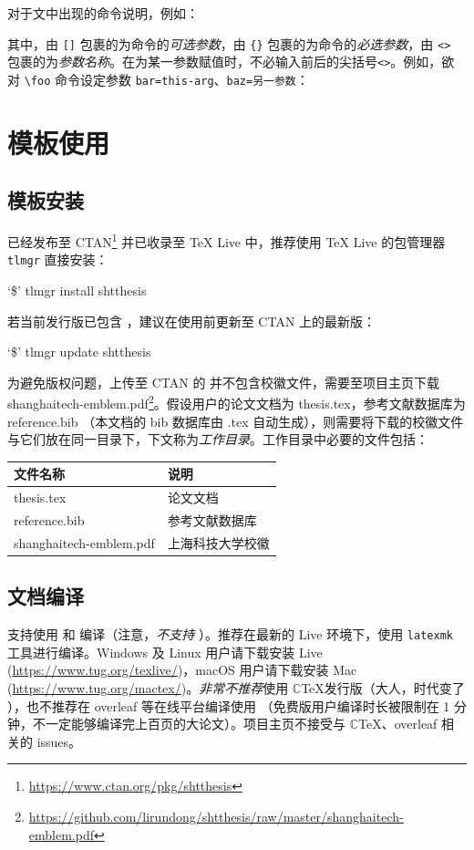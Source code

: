 \documentclass[master]{shtthesis}
\newcommand\prompt{\textup{\$}}
\providecommand{\emoji}[1]{ \fbox{\emph{#1}} }
\begin{document}
对于文中出现的命令说明，例如：
\begin{latex}
\end{latex}
其中，由 \verb|[]| 包裹的为命令的\emph{可选参数}，由 \verb|{}| 包裹的为命令的\emph{必选参数}，由 \verb|<>| 包裹的为\emph{参数名称}。在为某一参数赋值时，不必输入前后的尖括号\verb|<>|。例如，欲对 \verb|\foo| 命令设定参数 \verb|bar=this-arg|、\verb|baz=另一参数|：
\begin{latex}
\end{latex}

\chapter{模板使用}
\section{模板安装}
\shtthesis{} 已经发布至 CTAN\footnote{\url{https://www.ctan.org/pkg/shtthesis}} 并已收录至 \TeX{} Live 中，推荐使用 \TeX{} Live 的包管理器 \verb|tlmgr| 直接安装：
\begin{shell}
`\prompt' tlmgr install shtthesis
\end{shell}
若当前发行版已包含 \shtthesis{}，建议在使用前更新至 CTAN 上的最新版：
\begin{shell}
`\prompt' tlmgr update shtthesis
\end{shell}

为避免版权问题，上传至 CTAN 的 \shtthesis{} 并不包含校徽文件，需要至项目主页下载 shanghaitech-emblem.pdf\footnote{\url{https://github.com/lirundong/shtthesis/raw/master/shanghaitech-emblem.pdf}}。假设用户的论文文档为 thesis.tex，参考文献数据库为 reference.bib （本文档的 bib 数据库由 \jobname.tex 自动生成），则需要将下载的校徽文件与它们放在同一目录下，下文称为\emph{工作目录}。工作目录中必要的文件包括：
\begin{center}
  \begin{tabular}{ll}
    \toprule
    文件名称 & 说明 \\
    \midrule 
    thesis.tex & 论文文档 \\
    reference.bib & 参考文献数据库 \\
    shanghaitech-emblem.pdf & 上海科技大学校徽 \\
    \bottomrule
  \end{tabular}
\end{center}

\section{文档编译}
\shtthesis{} 支持使用  和  编译（注意，\emph{不支持} ）。推荐在最新的  Live 环境下，使用 \verb|latexmk| 工具进行编译。Windows 及 Linux 用户请下载安装  Live (\url{https://www.tug.org/texlive/})，macOS 用户请下载安装 Mac (\url{https://www.tug.org/mactex/})。\emph{非常不推荐}使用 $\mathbb{C}$\TeX 发行版（大人，时代变了\emoji{unamused}），也不推荐在 overleaf 等在线平台编译使用 \shtthesis{} （免费版用户编译时长被限制在 1 分钟，不一定能够编译完上百页的大论文）。项目主页不接受与 $\mathbb{C}$\TeX、overleaf 相关的 issues。
\end{document}
